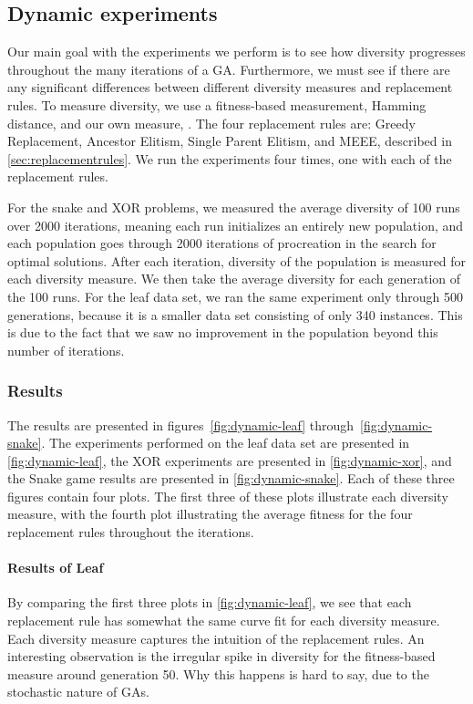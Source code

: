 \subsection{Dynamic experiments}\label{sec:continuousdiversity}
Our main goal with the experiments we perform is to see how diversity progresses throughout the many iterations of a GA. Furthermore, we must see if there are any significant differences between different diversity measures and replacement rules. To measure diversity, we use a fitness-based measurement, Hamming distance, and our own measure, \dia. The four replacement rules are: Greedy Replacement, Ancestor Elitism, Single Parent Elitism, and MEEE, described in \cref{sec:replacementrules}. We run the experiments four times, one with each of the replacement rules.

For the snake and XOR problems, we measured the average diversity of \num{100} runs over \num{2000} iterations, meaning each run initializes an entirely new population, and each population goes through \num{2000} iterations of procreation in the search for optimal solutions. After each iteration, diversity of the population is measured for each diversity measure. We then take the average diversity for each generation of the \num{100} runs. For the leaf data set, we ran the same experiment only through \num{500} generations, because it is a smaller data set consisting of only \num{340} instances. This is due to the fact that we saw no improvement in the population beyond this number of iterations. 

\subsubsection{Results}
The results are presented in figures~\ref{fig:dynamic-leaf} through~\ref{fig:dynamic-snake}. The experiments performed on the leaf data set are presented in \cref{fig:dynamic-leaf}, the XOR experiments are presented in \cref{fig:dynamic-xor}, and the Snake game results are presented in \cref{fig:dynamic-snake}. Each of these three figures contain four plots. The first three of these plots illustrate each diversity measure, with the fourth plot illustrating the average fitness for the four replacement rules throughout the iterations. 

\paragraph{Results of Leaf} By comparing the first three plots in \cref{fig:dynamic-leaf}, we see that each replacement rule has somewhat the same curve fit for each diversity measure. Each diversity measure captures the intuition of the replacement rules. An interesting observation is the irregular spike in diversity for the fitness-based measure around generation \num{50}. Why this happens is hard to say, due to the stochastic nature of GAs.


